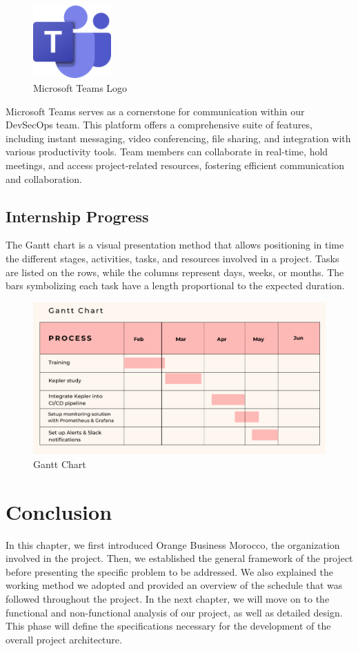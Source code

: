 \begin{figure}[H]
  \centering
  \includegraphics[width=3cm]{Logos/microsoft_teams_logo.png}
  \caption[]{Microsoft Teams Logo}
\end{figure}

Microsoft Teams serves as a cornerstone for communication within our DevSecOps team. This platform offers a comprehensive suite of features, including instant messaging, video conferencing, file sharing, and integration with various productivity tools. Team members can collaborate in real-time, hold meetings, and access project-related resources, fostering efficient communication and collaboration.

\subsection{Internship Progress}

The Gantt chart is a visual presentation method that allows positioning in time the different stages, activities, tasks, and resources involved in a project. Tasks are listed on the rows, while the columns represent days, weeks, or months. The bars symbolizing each task have a length proportional to the expected duration.
\begin{figure}[H]
    \centering
    \includegraphics[width=16cm]{Figures/gantt-chart.png}
    \caption{Gantt Chart}
\end{figure}
\section{Conclusion}
In this chapter, we first introduced Orange Business Morocco, the organization involved in the project. Then, we established the general framework of the project before presenting the specific problem to be addressed. We also explained the working method we adopted and provided an overview of the schedule that was followed throughout the project. In the next chapter, we will move on to the functional and non-functional analysis of our project, as well as detailed design. This phase will define the specifications necessary for the development of the overall project architecture.